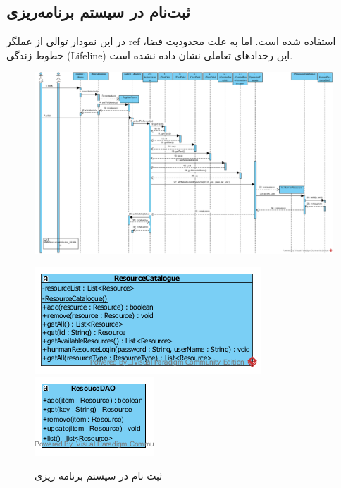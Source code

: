 \begin{landscape}
\newpage
\section{ثبت‌نام در سیستم برنامه‌ریزی}
در این نمودار توالی از عملگر ref استفاده شده است. اما به علت محدودیت فضا، خطوط زندگی (Lifeline) این رخدادهای تعاملی نشان داده نشده است.
\begin{figure}[H]
	\centering
	\includegraphics[scale=0.6]{img/sequence-design/SignUp}
\end{figure}
\begin{figure}[H]
	\centering
	\includegraphics[scale=0.7]{img/sequence-design/SignUpC}
	\includegraphics[scale=0.7]{img/sequence-design/SignUpD}
	\caption{ثبت نام در سیستم برنامه ریزی}
\end{figure}
\end{landscape}

